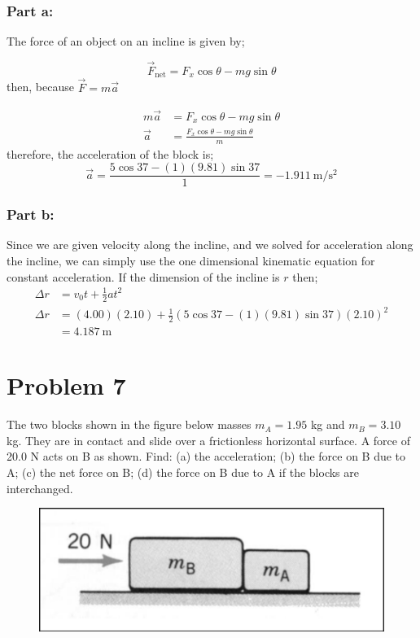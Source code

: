 \documentclass{article}
\begin{document}
\subsubsection*{Part a:}
The force of an object on an incline is given by;

\begin{equation}
	\vec{F}_\text{net} = F_x \cos \theta - mg \sin \theta
\end{equation}
then, because $\vec{F} = m \vec{a}$

\begin{align*}
	m \vec{a} &= F_x \cos \theta - mg \sin \theta \\
	\vec{a} &= \frac{F_x \cos \theta - mg \sin \theta}{m}
\end{align*}
therefore, the acceleration of the block is;
\[
	\vec{a} = \frac{5 \cos 37 - (1)(9.81) \sin 37}{1} = \boxed{-1.911\ \text{m}/\text{s}^2}
\]

\subsubsection*{Part b:}
Since we are given velocity along the incline, and we solved for acceleration along the incline, we can simply use the one dimensional kinematic equation for constant acceleration. If the dimension of the incline is $r$ then;
\begin{align*}
	\Delta r &= v_0t+\frac{1}{2}at^2 \\
	\Delta r &= (4.00)(2.10)+\frac{1}{2}\left(5 \cos 37 - (1)(9.81) \sin 37\right)(2.10)^2 \\
		 &= \boxed{4.187\ \text{m}}
\end{align*}

\pagebreak
\section*{Problem 7}
The two blocks shown in the figure below masses $m_A = 1.95$ kg and $m_B = 3.10$ kg. They are in contact
and slide over a frictionless horizontal surface. A force of 20.0 N acts on B as shown. Find: (a) the
acceleration; (b) the force on B due to A; (c) the net force on B; (d) the force on B due to A if the blocks are
interchanged.
\begin{figure}[ht]
    \centering
    \includegraphics[scale=.4]{drawing-5.png}
\end{figure}
\end{document}

